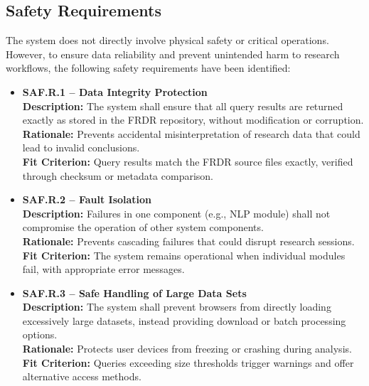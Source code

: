 \documentclass{article}
\begin{document}
\subsection{Safety Requirements}
\par{The system does not directly involve physical safety or critical operations. However, to ensure data reliability and prevent unintended harm to research workflows, the following safety requirements have been identified:}
\begin{itemize}
    \item \textbf{SAF.R.1 -- Data Integrity Protection} \\
    \textbf{Description:} The system shall ensure that all query results are returned exactly as stored in the FRDR repository, without modification or corruption. \\
    \textbf{Rationale:} Prevents accidental misinterpretation of research data that could lead to invalid conclusions. \\
    \textbf{Fit Criterion:} Query results match the FRDR source files exactly, verified through checksum or metadata comparison.
    
    \item \textbf{SAF.R.2 -- Fault Isolation} \\
    \textbf{Description:} Failures in one component (e.g., NLP module) shall not compromise the operation of other system components. \\
    \textbf{Rationale:} Prevents cascading failures that could disrupt research sessions. \\
    \textbf{Fit Criterion:} The system remains operational when individual modules fail, with appropriate error messages.
    
    \item \textbf{SAF.R.3 -- Safe Handling of Large Data Sets} \\
    \textbf{Description:} The system shall prevent browsers from directly loading excessively large datasets, instead providing download or batch processing options. \\
    \textbf{Rationale:} Protects user devices from freezing or crashing during analysis. \\
    \textbf{Fit Criterion:} Queries exceeding size thresholds trigger warnings and offer alternative access methods.
\end{itemize}
\end{document}
